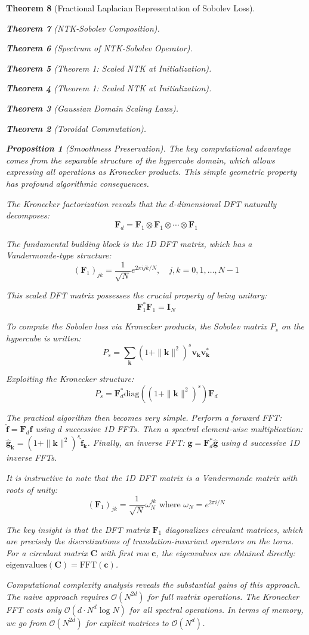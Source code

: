 \documentclass{article}
\newtheorem{theorem}{Theorem}[section]
\newtheorem{proposition}[theorem]{Proposition}
\begin{document}
\begin{theorem}[Fractional Laplacian Representation of Sobolev Loss]
\begin{theorem}[NTK-Sobolev Composition]
\begin{theorem}[Spectrum of NTK-Sobolev Operator]
\begin{theorem}[Theorem 1: Scaled NTK at Initialization]
\begin{theorem}[Theorem 1: Scaled NTK at Initialization]
\begin{theorem}[Gaussian Domain Scaling Laws]
\begin{theorem}[Toroidal Commutation]
\begin{proposition}[Smoothness Preservation]
The key computational advantage comes from the separable structure of the hypercube domain, which allows expressing all operations as Kronecker products. This simple geometric property has profound algorithmic consequences.

The Kronecker factorization reveals that the $d$-dimensional DFT naturally decomposes:
\[ \mathbf{F}_d = \mathbf{F}_1 \otimes \mathbf{F}_1 \otimes \cdots \otimes \mathbf{F}_1 \]

The fundamental building block is the 1D DFT matrix, which has a Vandermonde-type structure:
\[ (\mathbf{F}_1)_{jk} = \frac{1}{\sqrt{N}} e^{2\pi i jk/N}, \quad j,k = 0, 1, \ldots, N-1 \]

This scaled DFT matrix possesses the crucial property of being unitary:
\[ \mathbf{F}_1^* \mathbf{F}_1 = \mathbf{I}_N \]

To compute the Sobolev loss via Kronecker products, the Sobolev matrix $P_s$ on the hypercube is written:
\[ P_s = \sum_{\mathbf{k}} (1 + \|\mathbf{k}\|^2)^s \mathbf{v}_{\mathbf{k}} \mathbf{v}_{\mathbf{k}}^* \]

Exploiting the Kronecker structure:
\[ P_s = \mathbf{F}_d^* \text{diag}((1 + \|\mathbf{k}\|^2)^s) \mathbf{F}_d \]

The practical algorithm then becomes very simple. Perform a forward FFT: $\hat{\mathbf{f}} = \mathbf{F}_d \mathbf{f}$ using $d$ successive 1D FFTs. Then a spectral element-wise multiplication: $\hat{\mathbf{g}}_{\mathbf{k}} = (1 + \|\mathbf{k}\|^2)^s \hat{\mathbf{f}}_{\mathbf{k}}$. Finally, an inverse FFT: $\mathbf{g} = \mathbf{F}_d^* \hat{\mathbf{g}}$ using $d$ successive 1D inverse FFTs.

It is instructive to note that the 1D DFT matrix is a Vandermonde matrix with roots of unity:
\[ (\mathbf{F}_1)_{jk} = \frac{1}{\sqrt{N}} \omega_N^{jk} \text{ where } \omega_N = e^{2\pi i/N} \]

The key insight is that the DFT matrix $\mathbf{F}_1$ diagonalizes circulant matrices, which are precisely the discretizations of translation-invariant operators on the torus. For a circulant matrix $\mathbf{C}$ with first row $\mathbf{c}$, the eigenvalues are obtained directly: $\text{eigenvalues}(\mathbf{C}) = \text{FFT}(\mathbf{c})$.

Computational complexity analysis reveals the substantial gains of this approach. The naive approach requires $\mathcal{O}(N^{2d})$ for full matrix operations. The Kronecker FFT costs only $\mathcal{O}(d \cdot N^d \log N)$ for all spectral operations. In terms of memory, we go from $\mathcal{O}(N^{2d})$ for explicit matrices to $\mathcal{O}(N^d)$.


\end{proposition}
\end{theorem}
\end{theorem}
\end{theorem}
\end{theorem}
\end{theorem}
\end{theorem}
\end{theorem}
\end{document}
